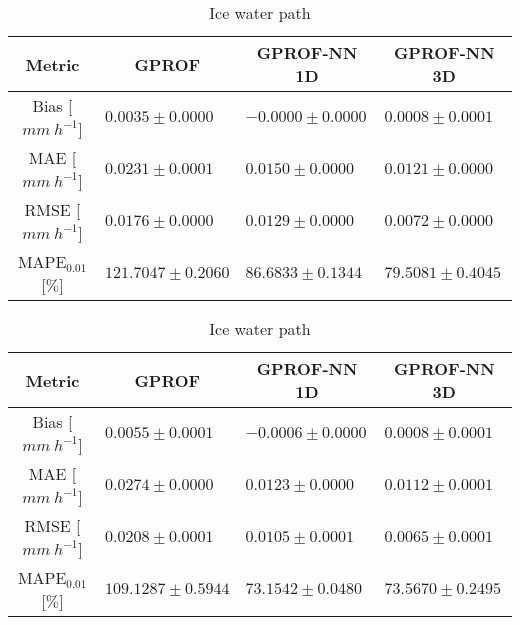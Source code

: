 \documentclass[a4paper,11pt,bibtotoc]{scrartcl}
\begin{document}
\begin{table}[hbpt!]
\begin{subtable}{\textwidth} 
 \caption{Rain water path} 
\begin{tabular}{|c||p{3.5cm}|p{3.5cm}|p{3.5cm}|}
\hline
Metric &
\multicolumn{1}{|c}{GPROF} &
\multicolumn{1}{|c}{GPROF-NN 1D} &
\multicolumn{1}{|c|}{GPROF-NN 3D} \\
\hline\hline
Bias \hfill [$\unit{mm\ h^{-1}}$] & \hfill $  0.0035 \pm 0.0000$ &\hfill $ -0.0000 \pm 0.0000$ &\hfill $  0.0008 \pm 0.0001$ \\
MAE \hfill [$\unit{mm\ h^{-1}}$] & \hfill $  0.0231 \pm 0.0001$ &\hfill $  0.0150 \pm 0.0000$ &\hfill $  0.0121 \pm 0.0000$ \\
RMSE \hfill [$\unit{mm\ h^{-1}}$] & \hfill $  0.0176 \pm 0.0000$ &\hfill $  0.0129 \pm 0.0000$ &\hfill $  0.0072 \pm 0.0000$ \\
MAPE$_{0.01}$ \hfill [$\unit{\%}$] & \hfill $121.7047 \pm 0.2060$ &\hfill $ 86.6833 \pm 0.1344$ &\hfill $ 79.5081 \pm 0.4045$ \\
\hline
\end{tabular}
\end{subtable}

\begin{subtable}{\textwidth} 
 \caption{Ice water path} 
\begin{tabular}{|c||p{3.5cm}|p{3.5cm}|p{3.5cm}|}
\hline
Metric &
\multicolumn{1}{|c}{GPROF} &
\multicolumn{1}{|c}{GPROF-NN 1D} &
\multicolumn{1}{|c|}{GPROF-NN 3D} \\
\hline\hline
Bias \hfill [$\unit{mm\ h^{-1}}$] & \hfill $  0.0055 \pm 0.0001$ &\hfill $ -0.0006 \pm 0.0000$ &\hfill $  0.0008 \pm 0.0001$ \\
MAE \hfill [$\unit{mm\ h^{-1}}$] & \hfill $  0.0274 \pm 0.0000$ &\hfill $  0.0123 \pm 0.0000$ &\hfill $  0.0112 \pm 0.0001$ \\
RMSE \hfill [$\unit{mm\ h^{-1}}$] & \hfill $  0.0208 \pm 0.0001$ &\hfill $  0.0105 \pm 0.0001$ &\hfill $  0.0065 \pm 0.0001$ \\
MAPE$_{0.01}$ \hfill [$\unit{\%}$] & \hfill $109.1287 \pm 0.5944$ &\hfill $ 73.1542 \pm 0.0480$ &\hfill $ 73.5670 \pm 0.2495$ \\
\hline
\end{tabular}
\end{subtable}


\end{table}
\end{document}
